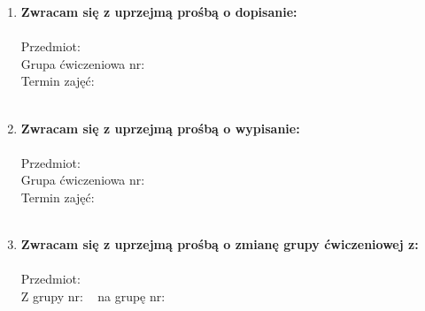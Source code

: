 \documentclass{wmiisubmission}
\begin{document}

\vskip 2.0cm

\begin{enumerate}
    \item \textbf{Zwracam się z uprzejmą prośbą o dopisanie:} \\\\
    Przedmiot: \dotfill\\
    Grupa ćwiczeniowa nr: \dotfill\\
    Termin zajęć: \dotfill\\\\

    \hfill \signature{(podpis prowadzącego)}

    \vskip 1.0cm

    \item \textbf{Zwracam się z uprzejmą prośbą o wypisanie:} \\\\
    Przedmiot: \dotfill\\
    Grupa ćwiczeniowa nr: \dotfill\\
    Termin zajęć: \dotfill\\\\

    \hfill \signature{(podpis prowadzącego)}

    \vskip 1.0cm

    \item \textbf{Zwracam się z uprzejmą prośbą o zmianę grupy ćwiczeniowej z:} \\\\
    Przedmiot: \dotfill\\
    Z grupy nr: \dotfill~ na grupę nr: \dotfill\\\\

    \signature{(podpis prowadzącego)} \hfill \signature{(podpis prowadzącego)}
\end{enumerate}
\end{document}

